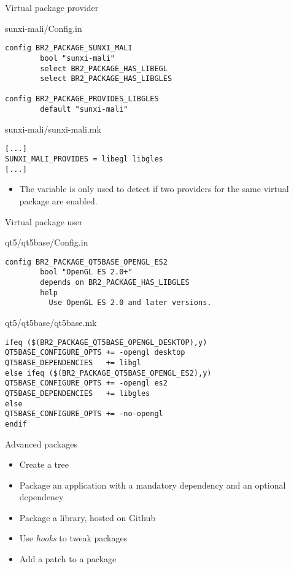 \begin{frame}[fragile]{Virtual package provider}

\begin{block}{sunxi-mali/Config.in}
{\small
\begin{verbatim}
config BR2_PACKAGE_SUNXI_MALI
        bool "sunxi-mali"
        select BR2_PACKAGE_HAS_LIBEGL
        select BR2_PACKAGE_HAS_LIBGLES

config BR2_PACKAGE_PROVIDES_LIBGLES
        default "sunxi-mali"
\end{verbatim}}
\end{block}

\begin{block}{sunxi-mali/sunxi-mali.mk}
\begin{verbatim}
[...]
SUNXI_MALI_PROVIDES = libegl libgles
[...]
\end{verbatim}
\end{block}

\begin{itemize}
\item The variable  is only used to detect if two
  providers for the same virtual package are enabled.
\end{itemize}

\end{frame}

\begin{frame}[fragile]{Virtual package user}

  \begin{block}{qt5/qt5base/Config.in}
{\small
\begin{verbatim}
config BR2_PACKAGE_QT5BASE_OPENGL_ES2
        bool "OpenGL ES 2.0+"
        depends on BR2_PACKAGE_HAS_LIBGLES
        help
          Use OpenGL ES 2.0 and later versions.
\end{verbatim}}
\end{block}

\begin{block}{qt5/qt5base/qt5base.mk}
\begin{verbatim}
ifeq ($(BR2_PACKAGE_QT5BASE_OPENGL_DESKTOP),y)
QT5BASE_CONFIGURE_OPTS += -opengl desktop
QT5BASE_DEPENDENCIES   += libgl
else ifeq ($(BR2_PACKAGE_QT5BASE_OPENGL_ES2),y)
QT5BASE_CONFIGURE_OPTS += -opengl es2
QT5BASE_DEPENDENCIES   += libgles
else
QT5BASE_CONFIGURE_OPTS += -no-opengl
endif
\end{verbatim}
\end{block}

\end{frame}

\setuplabframe
{Advanced packages}
{
  \begin{itemize}
  \item Create a  tree
  \item Package an application with a mandatory dependency and an
    optional dependency
  \item Package a library, hosted on Github
  \item Use {\em hooks} to tweak packages
  \item Add a patch to a package
  \end{itemize}
}
